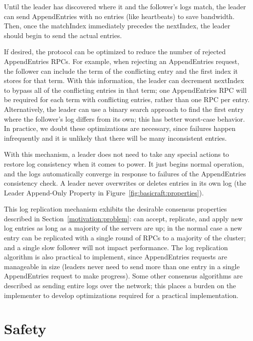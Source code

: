 Until the leader has discovered where it and the follower's logs match,
the leader can send AppendEntries with no entries (like heartbeats) to
save bandwidth. Then, once the matchIndex immediately precedes the nextIndex,
the leader should begin to send the actual entries.

If desired, the protocol can be optimized to reduce the number of rejected
AppendEntries RPCs.  For example, when rejecting an AppendEntries request, the
follower can include the term of the conflicting entry
and the first index it stores for that term. With this
information, the leader can decrement nextIndex to bypass all of the conflicting
entries in that term; one AppendEntries RPC will be required for each term
with conflicting entries, rather than one RPC per entry.
Alternatively, the leader can use a binary search approach to find
the first entry where the follower's log differs from its own; this has
better worst-case behavior.
In practice, we
doubt these optimizations are necessary, since failures happen infrequently and
it is unlikely that there will be many inconsistent entries.

With this mechanism, a leader does not need to take any special actions
to restore log consistency when it comes to power. It just begins normal
operation, and the logs automatically converge in response to
failures of the AppendEntries consistency check.
A leader never overwrites or deletes entries in its own log (the Leader
Append-Only Property in Figure~\ref{fig:basicraft:properties}).

This log replication mechanism exhibits the desirable consensus properties
described in Section~\ref{motivation:problem}: \name{} can accept, replicate, and
apply new log entries as long as a majority of the servers are up;
in the normal case a new entry can be replicated with a single round
of RPCs to a majority of the cluster;
and a single slow follower will not impact performance.
The log replication algorithm is also practical to implement, since
AppendEntries requests are manageable in size (leaders never need to
send more than one entry in a single AppendEntries request to make
progress). Some other consensus algorithms are described as
sending entire logs over the network; this places a burden on the
implementer to develop optimizations required for a practical
implementation.

\section{Safety}
\label{basicraft:safety}

